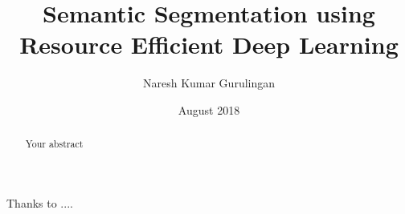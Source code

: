 \documentclass[rnd]{mas_report}
\author{Naresh Kumar Gurulingan}
\title{Semantic Segmentation using Resource Efficient Deep Learning}
\date{August 2018}
\begin{document}
\begin{titlepage}
    \maketitle
\end{titlepage}


\pagestyle{plain}


\cleardoublepage
\statementpage

\begin{abstract}
Your abstract
\end{abstract}


\begin{acknowledgements}
Thanks to ....
\end{acknowledgements}


\tableofcontents


\mainmatter %

\pagestyle{mainmatter}










\begin{appendices}


\end{appendices}

\backmatter

\end{document}
